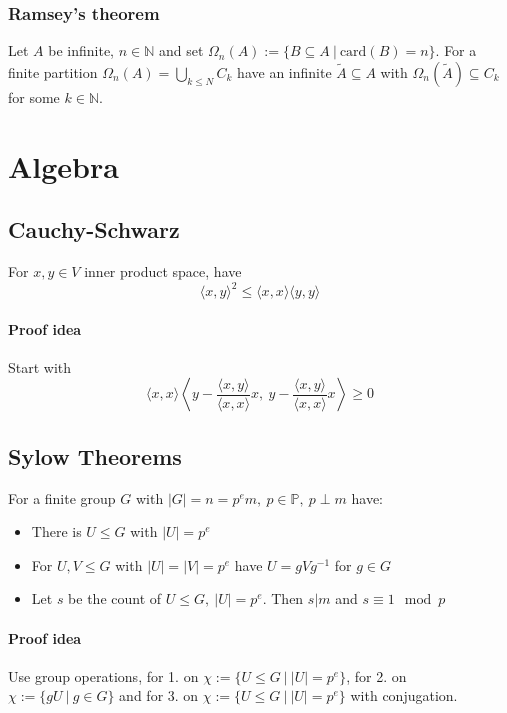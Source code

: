 \documentclass{scrartcl}
\newcommand{\N}{\mathbb{N}}
\begin{document}
\subsubsection{Ramsey's theorem}
Let $A$ be infinite, $n \in \N$ and set $\Omega_n(A) := \{ B \subseteq A \ | \ \mathrm{card}(B) = n \}$.
For a finite partition $\Omega_n(A) = \bigcup_{k \leq N} C_k$ have an infinite $\tilde{A} \subseteq A$ with $\Omega_n(\tilde{A}) \subseteq C_k$ for some $k \in \N$.

\section{Algebra}

\subsection{Cauchy-Schwarz}

For $x, y \in V$ inner product space, have
\begin{equation}
    \langle x, y \rangle^2 \leq \langle x, x \rangle \langle y, y \rangle \nonumber
\end{equation}
\paragraph{Proof idea} Start with
\begin{equation}
    \langle x, x \rangle \left\langle y - \frac {\langle x, y \rangle}{\langle x, x \rangle} x, \ y - \frac {\langle x, y \rangle}{\langle x, x \rangle} x \right\rangle \geq 0 \nonumber
\end{equation}

\subsection{Sylow Theorems}

For a finite group $G$ with $|G| = n = p^em, \ p \in \mathbb{P}, \ p \perp m$ have:
\begin{itemize}
    \item There is $U \leq G$ with $|U| = p^e$
    \item For $U, V \leq G$ with $|U| = |V| = p^e$ have $U = gVg^{-1}$ for $g \in G$
    \item Let $s$ be the count of $U \leq G, \ |U| = p^e$. Then $s | m$ and $s \equiv 1 \mod p$
\end{itemize}

\paragraph{Proof idea} Use group operations, for 1. on $\chi := \{ U \leq G \ | \ |U| = p^e \}$, for 2. on $\chi := \{ gU \ | \ g \in G \}$ and for 3. on $\chi := \{ U \leq G \ | \ |U| = p^e \}$ with conjugation.
\end{document}
